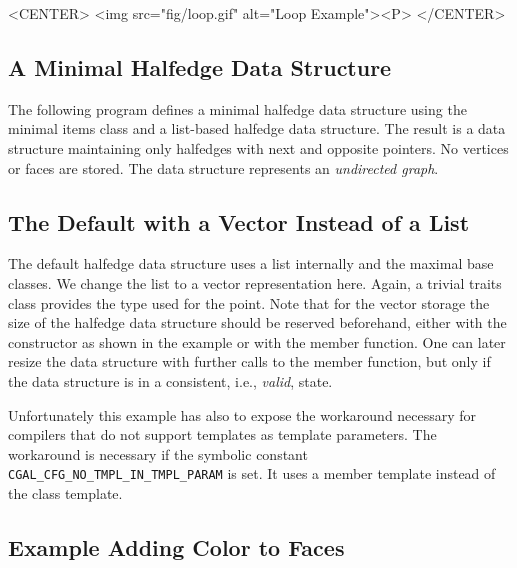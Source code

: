 \begin{ccHtmlOnly}
    <CENTER>
      <img src="fig/loop.gif" alt="Loop Example"><P>
    </CENTER>
\end{ccHtmlOnly}



\subsection{A Minimal Halfedge Data Structure}

The following program defines a minimal halfedge data structure using
the minimal items class  and a
list-based halfedge data structure. The result is a data structure
maintaining only halfedges with next and opposite pointers.  No
vertices or faces are stored. The data structure represents an {\em
  undirected graph}.



\subsection{The Default with a Vector Instead of a List}

The default halfedge data structure uses a list internally and the
maximal base classes. We change the list to a vector representation
here. Again, a trivial traits class provides the type used for the
point.  Note that for the vector storage the size of the halfedge data
structure should be reserved beforehand, either with the constructor
as shown in the example or with the  member function.
One can later resize the data structure with further calls to the
 member function, but only if the data structure is 
in a consistent, i.e., {\em valid}, state.

Unfortunately this example has also to expose the workaround necessary
for compilers that do not support templates as template parameters.
The workaround is necessary if the symbolic constant
\verb|CGAL_CFG_NO_TMPL_IN_TMPL_PARAM| is set. It uses a member 
template instead of the class template.



\subsection{Example Adding Color to Faces}

